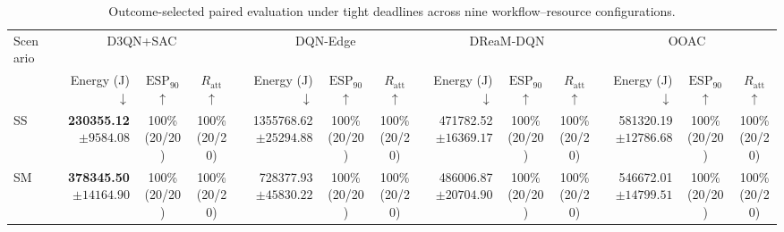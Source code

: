 \begin{table}[!t]
\centering
\caption{Outcome-selected paired evaluation under tight deadlines across nine workflow--resource configurations.}
\label{tab:conditional_full_tight}
\begingroup
\footnotesize
\setlength{\tabcolsep}{2.2pt}
\renewcommand{\arraystretch}{1.08}
\begin{tabular}{@{}l*{4}{rcc}@{}}
\toprule
Scenario & \multicolumn{3}{c}{D3QN+SAC} & \multicolumn{3}{c}{DQN-Edge} & \multicolumn{3}{c}{DReaM-DQN} & \multicolumn{3}{c}{OOAC} \\
\cmidrule(lr){2-4}\cmidrule(lr){5-7}\cmidrule(lr){8-10}\cmidrule(lr){11-13}
 & Energy (J) $\downarrow$ & $\mathrm{ESP}_{90}$ $\uparrow$ & $R_{\mathrm{att}}$ $\uparrow$ & Energy (J) $\downarrow$ & $\mathrm{ESP}_{90}$ $\uparrow$ & $R_{\mathrm{att}}$ $\uparrow$ & Energy (J) $\downarrow$ & $\mathrm{ESP}_{90}$ $\uparrow$ & $R_{\mathrm{att}}$ $\uparrow$ & Energy (J) $\downarrow$ & $\mathrm{ESP}_{90}$ $\uparrow$ & $R_{\mathrm{att}}$ $\uparrow$ \\
\midrule
SS & \shortstack[r]{\textbf{230355.12}\\$\pm 9584.08$} & \shortstack[c]{100\%\\(20/20)} & \shortstack[c]{100\%\\(20/20)} & \shortstack[r]{1355768.62\\$\pm 25294.88$} & \shortstack[c]{100\%\\(20/20)} & \shortstack[c]{100\%\\(20/20)} & \shortstack[r]{471782.52\\$\pm 16369.17$} & \shortstack[c]{100\%\\(20/20)} & \shortstack[c]{100\%\\(20/20)} & \shortstack[r]{581320.19\\$\pm 12786.68$} & \shortstack[c]{100\%\\(20/20)} & \shortstack[c]{100\%\\(20/20)} \\
SM & \shortstack[r]{\textbf{378345.50}\\$\pm 14164.90$} & \shortstack[c]{100\%\\(20/20)} & \shortstack[c]{100\%\\(20/20)} & \shortstack[r]{728377.93\\$\pm 45830.22$} & \shortstack[c]{100\%\\(20/20)} & \shortstack[c]{100\%\\(20/20)} & \shortstack[r]{486006.87\\$\pm 20704.90$} & \shortstack[c]{100\%\\(20/20)} & \shortstack[c]{100\%\\(20/20)} & \shortstack[r]{546672.01\\$\pm 14799.51$} & \shortstack[c]{100\%\\(20/20)} & \shortstack[c]{100\%\\(20/20)} \\

\end{tabular}
\end{table}
